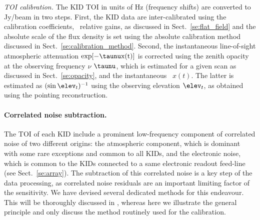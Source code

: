 %
%
%
  
\noindent \emph{TOI calibration.}
\label{se:flux_calib}
The KID TOI in units of Hz (frequency shifts) are converted to
Jy/beam in two steps. First, the KID data are inter-calibrated using the
calibration coefficients, \aka\ relative gains, 
as discussed in Sect.~\ref{se:flat_field} and the
absolute scale of the flux density is set using the absolute
calibration method discussed in
Sect.~\ref{se:calibration_method}. Second, the instantaneous line-of-sight
atmospheric attenuation $\rm{exp}[{-\taunu x(t)}]$ is corrected
using the zenith opacity at the observing frequency $\nu$ $\taunu$, which is estimated for a given scan
as discussed in Sect.~\ref{se:opacity}, and the instantaneous \airmass\
$x(t)$. {\lp The latter is estimated as $(\sin \elev_t)^{-1}$ using the observing elevation
$\elev_t$, as obtained using the pointing reconstruction.}\\     

\paragraph{Correlated noise subtraction.}
\label{se:toi_proc}
The TOI of each KID include a prominent low-frequency component of correlated noise of two
different origins: the atmospheric component, which is dominant
{\lp with some rare exceptions} and common to all KIDs, and the electronic noise, which is common to the KIDs connected
to a same electronic readout feed-line (see
Sect.~\ref{se:array}). The subtraction of this correlated noise is a key
step of the data processing, as correlated noise residuals are an
important limiting factor of the sensitivity. We have devised several
dedicated methods for this endeavour. This will be thoroughly
discussed in \citet{Ponthieu2019}, whereas here we illustrate the
general principle and only discuss the method routinely used for
the calibration.

